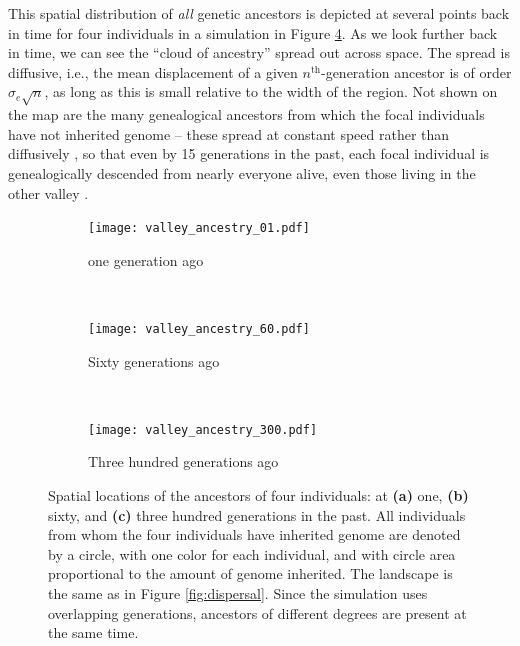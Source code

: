 \documentclass{ar-1col}
\renewcommand{\emph}[1]{{\textit{#1}}}
\begin{document}
This spatial distribution of \emph{all} genetic ancestors is depicted 
at several points back in time
for four individuals in a simulation in Figure \ref{ancestry_spread}.
As we look further back in time,
we can see the ``cloud of ancestry'' spread out across space.
The spread is diffusive,
i.e., the mean displacement of a given $n^\text{th}$-generation ancestor 
is of order $\sigma_e \sqrt{n}$,
as long as this is small relative to the width of the region.
Not shown on the map are the many genealogical ancestors
from which the focal individuals have not inherited genome --
these spread at constant speed rather than diffusively \citep{kelleher2016spread},
so that even by 15 generations in the past,
each focal individual is genealogically descended from nearly everyone alive,
even those living in the other valley \citep{chang1999}.

\begin{figure}	%
	\begin{subfigure}{0.85\textwidth}
		\centering
	        \texttt{[image: valley\_ancestry\_01.pdf]}
		\caption{one generation ago}
		\label{1gen}
	\end{subfigure}\\
	\begin{subfigure}{0.85\textwidth}
		\centering
	        \texttt{[image: valley\_ancestry\_60.pdf]}
	        \caption{Sixty generations ago}
		\label{60gen}
	\end{subfigure}\\
	\begin{subfigure}{0.85\textwidth}
        		\centering
        		\texttt{[image: valley\_ancestry\_300.pdf]}
                \caption{Three hundred generations ago}
		\label{300gen}
	\end{subfigure}
        \caption{
            Spatial locations of the ancestors of four individuals:
            at 
            \textbf{(a)} one, 
            \textbf{(b)} sixty, and
            \textbf{(c)} three hundred generations in the past.
            All individuals from whom the four individuals have inherited genome are denoted by a circle,
            with one color for each individual,
            and with circle area proportional to the amount of genome inherited.
            The landscape is the same as in Figure \ref{fig:dispersal}.
            Since the simulation uses overlapping generations,
            ancestors of different degrees are present at the same time.
        }
        \label{ancestry_spread}
\end{figure}
\end{document}
